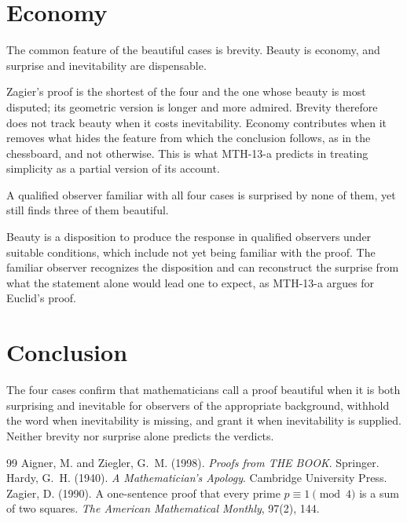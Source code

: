 \documentclass{situationist-preprint}
\begin{document}
\section{Economy}

\begin{objection}
The common feature of the beautiful cases is brevity. Beauty is economy, and surprise and inevitability are dispensable.
\end{objection}

\begin{reply}
Zagier's proof is the shortest of the four and the one whose beauty is most disputed; its geometric version is longer and more admired. Brevity therefore does not track beauty when it costs inevitability. Economy contributes when it removes what hides the feature from which the conclusion follows, as in the chessboard, and not otherwise. This is what MTH-13-a predicts in treating simplicity as a partial version of its account.
\end{reply}

\begin{objection}
A qualified observer familiar with all four cases is surprised by none of them, yet still finds three of them beautiful.
\end{objection}

\begin{reply}
Beauty is a disposition to produce the response in qualified observers under suitable conditions, which include not yet being familiar with the proof. The familiar observer recognizes the disposition and can reconstruct the surprise from what the statement alone would lead one to expect, as MTH-13-a argues for Euclid's proof.
\end{reply}

\section{Conclusion}

The four cases confirm that mathematicians call a proof beautiful when it is both surprising and inevitable for observers of the appropriate background, withhold the word when inevitability is missing, and grant it when inevitability is supplied. Neither brevity nor surprise alone predicts the verdicts.

\begin{thebibliography}{99}\small
{} Aigner, M. and Ziegler, G.~M. (1998). \emph{Proofs from THE BOOK}. Springer.
 Hardy, G.~H. (1940). \emph{A Mathematician's Apology}. Cambridge University Press.
 Zagier, D. (1990). A one-sentence proof that every prime $p \equiv 1 \pmod 4$ is a sum of two squares. \emph{The American Mathematical Monthly}, 97(2), 144.
\end{thebibliography}
\end{document}
